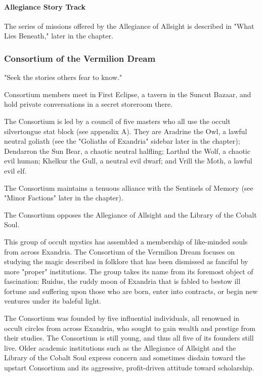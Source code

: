 \documentclass[10pt,a4paper,twoside,twocolumn,openany,nodeprecatedcode]{dndbook}
\begin{document}
\paragraph{Allegiance Story Track}
The series of missions offered by the Allegiance of Allsight is described in "What Lies Beneath," later in the chapter.

\subsubsection{Consortium of the Vermilion Dream}
"Seek the stories others fear to know."


\begin{description}[nolistsep]
\item[Headquarters.]
Consortium members meet in First Eclipse, a tavern in the Suncut Bazaar, and hold private conversations in a secret storeroom there.
\item[Leader.]
The Consortium is led by a council of five masters who all use the occult silvertongue stat block (see appendix A). They are Aradrine the Owl, a lawful neutral goliath (see the "Goliaths of Exandria" sidebar later in the chapter); Dendarron the Sun Bear, a chaotic neutral halfling; Larthul the Wolf, a chaotic evil human; Khelkur the Gull, a neutral evil dwarf; and Vrill the Moth, a lawful evil elf.
\item[Allies.]
The Consortium maintains a tenuous alliance with the Sentinels of Memory (see "Minor Factions" later in the chapter).
\item[Opponents.]
The Consortium opposes the Allegiance of Allsight and the Library of the Cobalt Soul.
\end{description}

This group of occult mystics has assembled a membership of like-minded souls from across Exandria. The Consortium of the Vermilion Dream focuses on studying the magic described in folklore that has been dismissed as fanciful by more "proper" institutions. The group takes its name from its foremost object of fascination: Ruidus, the ruddy moon of Exandria that is fabled to bestow ill fortune and suffering upon those who are born, enter into contracts, or begin new ventures under its baleful light.

The Consortium was founded by five influential individuals, all renowned in occult circles from across Exandria, who sought to gain wealth and prestige from their studies. The Consortium is still young, and thus all five of its founders still live. Older academic institutions such as the Allegiance of Allsight and the Library of the Cobalt Soul express concern and sometimes disdain toward the upstart Consortium and its aggressive, profit-driven attitude toward scholarship.
\end{document}
